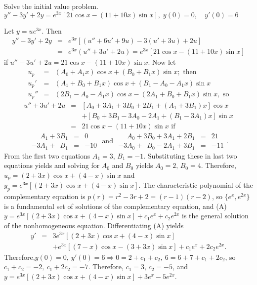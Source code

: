 \documentclass{ximera}
\begin{document}
\begin{problem}\label{exer:5.5.26}
Solve the
initial value problem. $y''-3y'+2y=e^{3x}\left[21\cos x-(11+10x)\sin x\right],
\;  y(0)=0, \quad   y'(0)=6$

\begin{solution}
    Let $y=ue^{3x}$. Then
\begin{eqnarray*}
y''-3y'+2y&=&e^{3x}\left[(u''+6u'+9u)-3(u'+3u)+2u\right]\\
&=&e^{3x}(u''+3u'+2u)=
e^{3x}\left[21\cos x-(11+10x)\sin x\right]
\end{eqnarray*}
if $u''+3u'+2u=21\cos x-(11+10x)\sin x$.
Now let
\begin{eqnarray*}
u_p&=&(A_0+A_1x)\cos x+(B_0+B_1x)\sin x; \mbox{ then}\\
u_p'&=&(A_1+B_0+B_1x)\cos x+(B_1-A_0-A_1x)\sin x\\
u_p''&=&(2B_1-A_0-A_1x)\cos x-(2A_1+B_0+B_1x)\sin x, \mbox{ so}
\end{eqnarray*}
\begin{eqnarray*}
u''+3u'+2u&=&\left[A_0+3A_1+3B_0+2B_1+(A_1+3B_1)x\right]\cos x\\
&&+\left[B_0+3 B_1-3A_0-2A_1+(B_1-3A_1)x\right]\sin x \\
&=&21\cos x-(11+10x)\sin x \mbox{ if}
\end{eqnarray*}
$$
\begin{array}{rcr}
\phantom{-3}A_1+3B_1&=&0\\ -3A_1+\phantom{3}B_1&=&-10
\end{array}
\mbox{\  and \ }
\begin{array}{rcr}
\phantom{-3} A_0+3B_0+3A_1+2B_1&=&21\\
-3A_0+\phantom{3}B_0-2A_1+3B_1&=&-11
\end{array}.
$$
From the first two equations $A_1=3$, $B_1=-1$. Substituting these in
last two equations yields and solving for $A_0$ and $B_0$ yields
$A_0=2$, $B_0=4$. Therefore,
$u_p=(2+3x)\cos x+(4-x)\sin x$ and
$y_p=e^{3x}\left[(2+3x)\cos x+(4-x)\sin x\right]$.
The characteristic polynomial of the complementary equation is
$p(r)=r^2-3r+2=(r-1)(r-2)$, so $\{e^x,e^{2x}\}$ is a fundamental
set of solutions of the complementary equation, and
(A) $y=e^{3x}\left[(2+3x)\cos x+(4-x)\sin x\right]+c_1e^x+c_2e^{2x}$
is the general solution of the nonhomogeneous
equation. Differentiating (A) yields
\begin{eqnarray*}
y'&=&3e^{3x}\left[(2+3x)\cos x+(4-x)\sin x\right]\\ &&+
e^{3x}\left[(7-x)\cos x-(3+3x)\sin x\right]+c_1e^x+2c_2e^{2x}.
\end{eqnarray*}
 Therefore,$y(0)=0,\ y'(0)=6\Rightarrow 0=2+c_1+c_2,\
6=6+7+c_1+2c_2$, so $c_1+c_2=-2,\ c_1+2c_2=-7$.  Therefore,
$c_1=3$, $c_2=-5$, and
 $y=e^{3x}\left[(2+3x)\cos x+(4-x)\sin x\right]+3e^x-5e^{2x}$.
\end{solution}
\end{problem}
\end{document}
